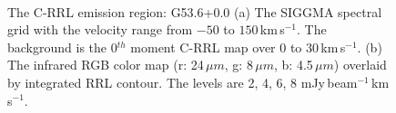 \documentclass[manuscript]{aastex61}
\newcommand{\kms}{\,km\,s$^{-1}$}
\newcommand{\um}{\mu m}
\begin{document}
\begin{figure}[H]
\centering
{}
\\
\caption{The C-RRL emission region: G53.6+0.0
          (a) The SIGGMA spectral grid with the velocity range from $-50$ to $150$\kms.
	  The background is the 0$^{th}$ moment C-RRL map over $0$ to $30$\kms.
	  (b) The infrared RGB color map (r: 24\,$\um$, g: 8\,$\um$, b: 4.5\,$\um$) overlaid by integrated RRL contour.
	  The levels are 2, 4, 6, 8 mJy\,beam$^{-1}$\kms.}
\label{fig_crrl-g536}
\end{figure}
\end{document}
